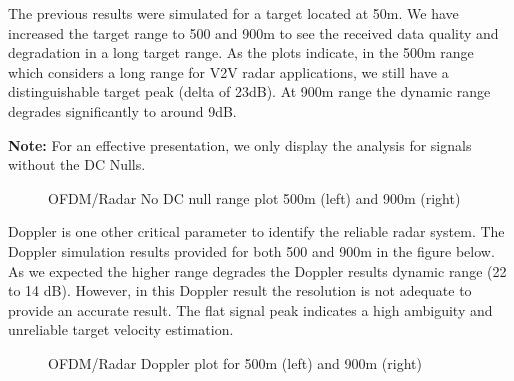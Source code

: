 \documentclass[conference]{IEEEtran}
\begin{document}
The previous results were simulated for a target located at 50m. We have increased the target range to 500 and 900m to see the received data quality and degradation in a long target range. As the plots indicate, in the 500m range which considers a long range for V2V radar applications, we still have a distinguishable target peak (delta of 23dB). At 900m range the dynamic range degrades significantly to around 9dB. \par
\textbf{ Note: } For an effective presentation, we only display the analysis for signals without the DC Nulls.
\begin{figure}[H]
\centering
{}
\caption{OFDM/Radar No DC null range plot 500m (left) and 900m (right)}
\end{figure} 
Doppler is one other critical parameter to identify the reliable radar system. The Doppler simulation results provided for both 500 and 900m in the figure below. As we expected the higher range degrades the Doppler results dynamic range (22 to 14 dB). However, in this Doppler result the resolution is not adequate to provide an accurate result. The flat signal peak indicates a high ambiguity and unreliable target velocity estimation.
\begin{figure}[H]
\centering
{}
\caption{OFDM/Radar Doppler plot for 500m (left) and 900m (right)}
\end{figure} 
\end{document}
